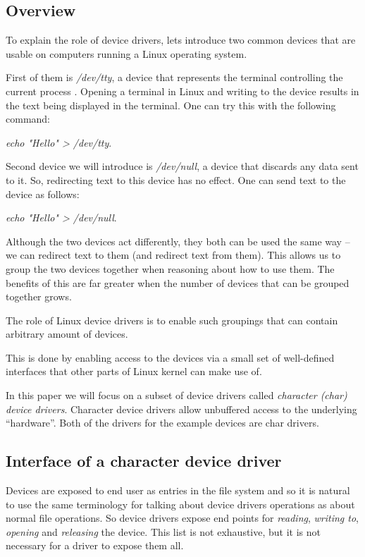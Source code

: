 \documentclass[..thesis.tex]{subfiles}
\begin{document}
\subsection{Overview}


To explain the role of device drivers, lets introduce two common devices that are usable on computers running a Linux operating system.

First of them is \textit{/dev/tty}, a device that represents the terminal controlling the current process \cite{torvalds_linux}. Opening a terminal in Linux and writing to the device results in the text being displayed in the terminal. One can try this with the following command: 

\textit{echo "Hello" > /dev/tty}.
 
Second device we will introduce is \textit{/dev/null}, a device that discards any data sent to it. So, redirecting text to this device has no effect.
One can send text to the device as follows:

\textit{echo "Hello" > /dev/null}.

Although the two devices act differently, they both can be used the same way -- we can redirect text to them (and redirect text from them). This allows us to group the two devices together when reasoning about how to use them. The benefits of this are far greater when the number of devices that can be grouped together grows.

The role of Linux device drivers is to enable such groupings that can contain arbitrary amount of devices.

This is done by enabling access to the devices via a small set of well-defined interfaces that other parts of Linux kernel can make use of. 

In this paper we will focus on a subset of device drivers called \textit{character (char) device drivers}. Character device drivers allow unbuffered access to the underlying ``hardware''. Both of the drivers for the example devices are char drivers.

\subsection{Interface of a character device driver}

Devices are exposed to end user as entries in the file system and so it is natural to use the same terminology for talking about device drivers operations as about normal file operations. So device drivers expose end points for \textit{reading}, \textit{writing to}, \textit{opening} and \textit{releasing} the device. This list is not exhaustive\cite[include/linux/fs.h]{torvalds_linux}, but it is not necessary for a driver to expose them all.
\end{document}
